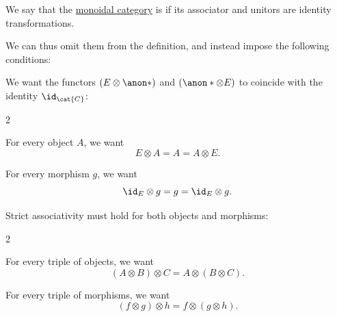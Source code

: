 \begin{definition}\label{def:strict_monoidal_category}
  We say that the \hyperref[def:monoidal_category]{monoidal category} is  if its associator and unitors are identity transformations.

  We can thus omit them from the definition, and instead impose the following conditions:
  \begin{thmenum}
     We want the functors \( (E \otimes \anon*) \) and \( (\anon* \otimes E) \) to coincide with the identity \( \id_{\cat{C}} \):
    \begin{paracol}{2}
      \begin{leftcolumn}
        For every object \( A \), we want
        \begin{equation*}
          E \otimes A = A = A \otimes E.
        \end{equation*}
      \end{leftcolumn}

      \begin{rightcolumn}
        For every morphism \( g \), we want
        \begin{equation*}
          \id_E \otimes g = g = \id_E \otimes g.
        \end{equation*}
      \end{rightcolumn}
    \end{paracol}

     Strict associativity must hold for both objects and morphisms:
    \begin{paracol}{2}
      \begin{leftcolumn}
        For every triple of objects, we want
        \begin{equation*}
          (A \otimes B) \otimes C = A \otimes (B \otimes C).
        \end{equation*}
      \end{leftcolumn}

      \begin{rightcolumn}
        For every triple of morphisms, we want
        \begin{equation*}
          (f \otimes g) \otimes h = f \otimes (g \otimes h).
        \end{equation*}
      \end{rightcolumn}
    \end{paracol}
  \end{thmenum}
\end{definition}

